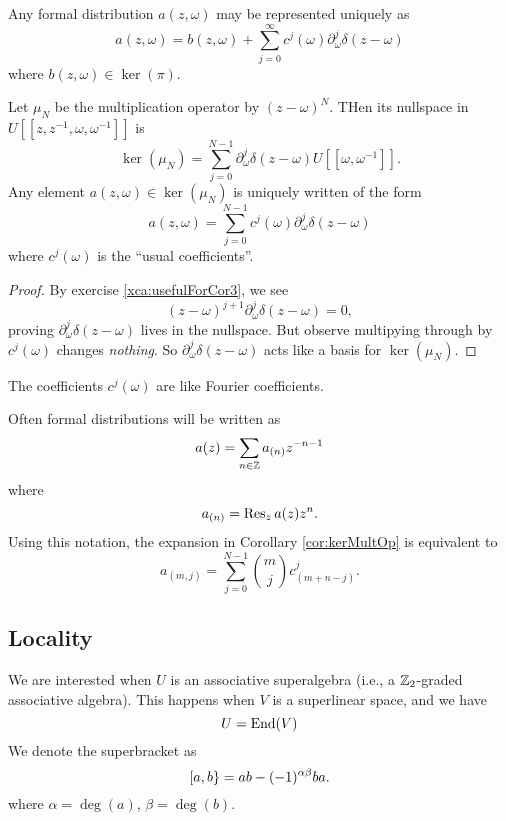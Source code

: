 \begin{cor}
Any formal distribution $a(z,\omega)$ may be represented uniquely as
\begin{equation}
a(z,\omega)=b(z,\omega) + \sum^{\infty}_{j=0}c^{j}(\omega)\partial^{j}_{\omega}\delta(z-\omega)
\end{equation}
where $b(z,\omega)\in\ker(\pi)$.
\end{cor}
\begin{cor}\label{cor:kerMultOp}
Let $\mu_{N}$ be the multiplication operator by $(z-\omega)^{N}$. THen
its nullspace in $U[[z,z^{-1},\omega,\omega^{-1}]]$ is
\begin{equation}
\ker(\mu_{N})=\sum^{N-1}_{j=0}\partial^{j}_{\omega}\delta(z-\omega)U[[\omega,\omega^{-1}]].
\end{equation}
Any element $a(z,\omega)\in\ker(\mu_N)$ is uniquely written of the form
\begin{equation}
a(z,\omega)=\sum^{N-1}_{j=0}c^{j}(\omega)\partial^{j}_{\omega}\delta(z-\omega)
\end{equation}
where $c^{j}(\omega)$ is the ``usual coefficients''.
\end{cor}
\begin{proof}
By exercise \ref{xca:usefulForCor3}, we see
\begin{equation}
(z-\omega)^{j+1}\partial_{\omega}^{j}\delta(z-\omega)=0,
\end{equation}
proving $\partial_{\omega}^{j}\delta(z-\omega)$ lives in the
nullspace. But observe multipying through by $c^{j}(\omega)$ changes
\emph{nothing}. So $\partial_{\omega}^{j}\delta(z-\omega)$ acts like a
basis for $\ker(\mu_N)$.
\end{proof}
\begin{rmk}
The coefficients $c^{j}(\omega)$ are like Fourier coefficients.
\end{rmk}
Often formal distributions will be written as 
\begin{equation}
a(z)=\sum_{n\in\ZZ}a_{(n)}z^{-n-1}
\end{equation}
where
\begin{equation}
a_{(n)}=\Res[z]{a(z)z^{n}}.
\end{equation}
Using this notation, the expansion in Corollary \ref{cor:kerMultOp} is
equivalent to 
\begin{equation}
a_{(m,j)}=\sum^{N-1}_{j=0}\binom{m}{j}c^{j}_{(m+n-j)}.
\end{equation}

\subsection{Locality}
\M
We are interested when $U$ is an associative superalgebra (i.e., a
$\ZZ_2$-graded associative algebra). This happens when $V$ is a
superlinear space, and we have
\begin{equation}
U=\End(V)
\end{equation}
We denote the superbracket as
\begin{equation}
\superb{a}{b}=ab-(-1)^{\alpha\beta}ba.
\end{equation}
where $\alpha=\deg(a)$, $\beta=\deg(b)$.

